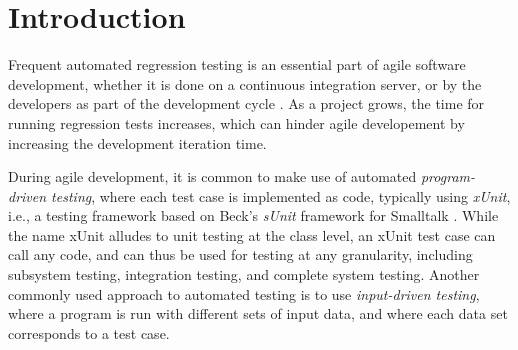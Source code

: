 {\section{Introduction}



Frequent automated regression testing is an essential part of agile software development,
whether it is done
on a continuous integration server, or
by the developers as part of the development cycle \cite{beck1999embracing}.
As a project grows, the time for running regression tests increases, which can hinder agile
developement by increasing the development iteration time.


%

During agile development, it is common to make use of automated \emph{program-driven testing}, where each test case is implemented as code, typically using \emph{xUnit}, i.e., a testing framework based on Beck's \emph{sUnit} framework for Smalltalk \cite{beck1994simple}. While the name xUnit alludes to unit testing at the class level, an xUnit test case can call any code, and can thus be used for testing at any granularity, including subsystem testing, integration testing, and complete system testing. Another commonly used approach to automated testing is to use \emph{input-driven testing}, where a program is run with different sets of input data, and where each data set corresponds to a test case.

}
